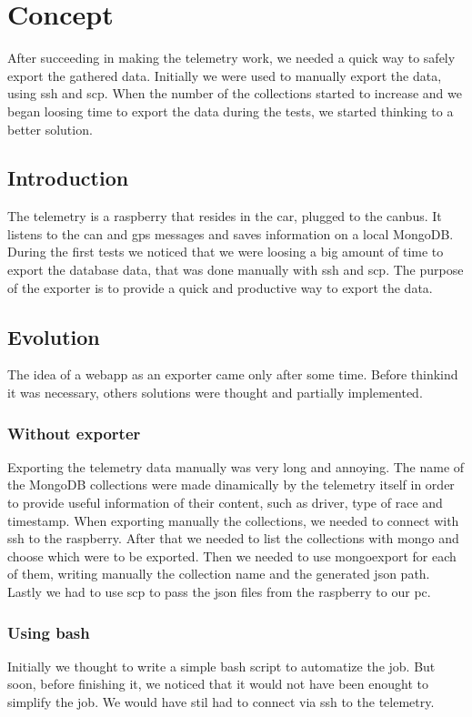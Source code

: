 \section{\huge{Concept}}
After succeeding in making the telemetry work, we needed a quick way to safely export the gathered data. 
Initially we were used to manually export the data, using ssh and scp. When the number of the collections 
started to increase and we began loosing time to export the data during the tests, we started thinking to 
a better solution.

\subsection{Introduction}
The telemetry is a raspberry that resides in the car, plugged to the canbus. 
It listens to the can and gps messages and saves information on a local MongoDB. 
During the first tests we noticed that we were loosing a big amount of time to export the database data, 
that was done manually with ssh and scp. The purpose of the exporter is to provide a quick and productive way 
to export the data. 

\subsection{Evolution}
The idea of a webapp as an exporter came only after some time. Before thinkind it was necessary, 
others solutions were thought and partially implemented.

\subsubsection{Without exporter}
Exporting the telemetry data manually was very long and annoying. 
The name of the MongoDB collections were made dinamically by the telemetry itself in order 
to provide useful information of their content, such as driver, type of race and timestamp. 
When exporting manually the collections, we needed to connect with ssh to the raspberry. 
After that we needed to list the collections with mongo and choose which were to be exported. 
Then we needed to use mongoexport for each of them, writing manually the collection name and the 
generated json path. Lastly we had to use scp to pass the json files from the raspberry to our pc.

\subsubsection{Using bash}
Initially we thought to write a simple bash script to automatize the job. But soon, before finishing it, 
we noticed that it would not have been enought to simplify the job. We would have stil had to connect via 
ssh to the telemetry.

